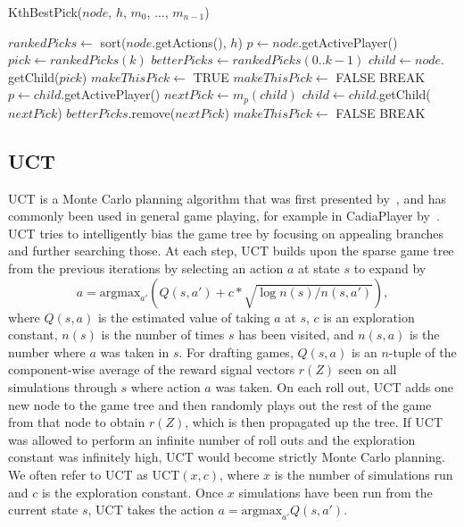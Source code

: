 \documentclass[letterpaper]{article}
\numberwithin{equation}{section}
\numberwithin{theorem}{section}
\numberwithin{lemma}{section}
\numberwithin{df}{section}
\begin{document}
\begin{algorithm}[t]
	\caption{KthBestPick($node$, $h$, $m_0$, ..., $m_{n-1}$)}
	\label{alg:kth}
	\begin{footnotesize}
	\begin{algorithmic}[1]
		\STATE $rankedPicks \gets $ sort($node$.getActions(), $h$)
		\STATE $p \gets node$.getActivePlayer()
			\STATE $pick \gets rankedPicks(k)$
			\STATE $betterPicks \gets rankedPicks(0..k-1)$
			\STATE $child \gets node.$getChild($pick$)
			\STATE $makeThisPick \gets $ TRUE
					\STATE $makeThisPick \gets $ FALSE
					\STATE BREAK
				\ENDIF
				\STATE $p \gets child$.getActivePlayer()
				\STATE $nextPick \gets m_p(child)$
				\STATE $child \gets child.$getChild($nextPick$)
						\STATE $betterPicks.$remove($nextPick$)
					\ELSE
						\STATE $makeThisPick \gets $ FALSE
						\STATE BREAK
					\ENDIF
				\ENDIF
			\ENDWHILE
			\ENDIF
		\ENDFOR
	\end{algorithmic}
	\end{footnotesize}
\end{algorithm}

\subsection{UCT}

UCT is a Monte Carlo planning algorithm that was first presented by~\cite{UCT}, and has commonly been used in general game playing, for example in CadiaPlayer by~\cite{Cadia}. 
UCT tries to intelligently bias the game tree by focusing on appealing branches and further searching those. At each step, UCT builds upon the sparse game tree from the previous iterations by selecting an action $a$ at state $s$ to expand by
\[ a = \text{argmax}_{a'} \left( Q(s,a') + c* \sqrt{ \log n(s) / n(s,a') } \right), \]
where $Q(s,a)$ is the estimated value of taking $a$ at $s$, $c$ is an exploration constant, $n(s)$ is the number of times $s$ has been visited, and $n(s,a)$ is the number where $a$ was taken in $s$.  For drafting games, $Q(s,a)$ is an $n$-tuple of the component-wise average of the reward signal vectors $r(Z)$ seen on all simulations through $s$ where action $a$ was taken.  On each roll out, UCT adds one new node to the game tree and then randomly plays out the rest of the game from that node to obtain $r(Z)$, which is then propagated up the tree.  If UCT was allowed to perform an infinite number of roll outs and the exploration constant was infinitely high,  UCT would become strictly Monte Carlo planning.  We often refer to UCT as UCT$(x,c)$, where $x$ is the number of simulations run and $c$ is the exploration constant.  Once $x$ simulations have been run from the current state $s$, UCT takes the action $a = \text{argmax}_{a'}Q(s,a')$.
\end{document}
